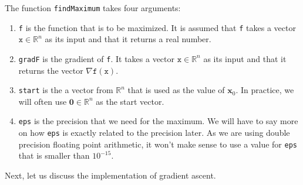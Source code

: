 \noindent
The function \texttt{findMaximum} takes four arguments:
\begin{enumerate}
\item \texttt{f} is the function that is to be maximized.  It is assumed that \texttt{f} takes a vector
      $\texttt{x}\in \mathbb{R}^n$ as its input and that it returns a real number.
\item \texttt{gradF} is the gradient of \texttt{f}.  It takes a vector
      $\texttt{x}\in \mathbb{R}^n$ as its input and that it returns the vector $\nabla \mathtt{f}(\mathtt{x})$.
\item \texttt{start} is the a vector from $\mathbb{R}^n$ that is used as the value of $\mathbf{x}_0$.  In
      practice, we will often use $\mathbf{0} \in \mathbb{R}^n$ as the start vector.
\item \texttt{eps} is the precision that we need for the maximum.  We will have to say more on how \texttt{eps}
      is exactly related to the precision later.  As we are using double precision floating point arithmetic, 
      it won't make sense to use a value for \texttt{eps} that is smaller than $10^{-15}$.
\end{enumerate}
Next, let us discuss the implementation of gradient ascent.
